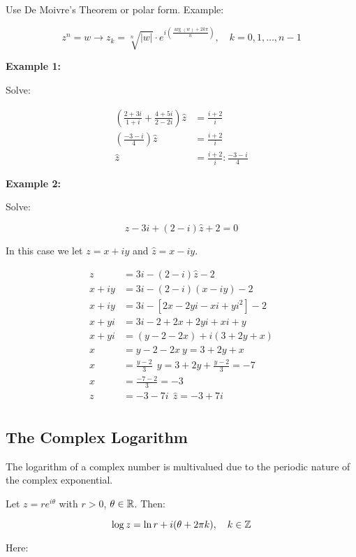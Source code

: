  Use De Moivre’s Theorem or polar form. Example:
	      
\[
	z^n = w \to z_k = \sqrt[n]{|w|} \cdot e^{i\left( \frac{\arg(w) + 2k\pi}{n} \right)}, \quad k = 0, 1, 
	\dots, n-1
\]

\textbf{Example 1:}

Solve:

\begin{align*}
	\left( \frac{2 + 3i}{1 + i} + \frac{4 + 5i}{2 - 2i}\right) \hat{z} &= \frac{i + 2}{i}\\
	\left( \frac{-3 -i}{4} \right) \hat{z} &= \frac{i + 2}{i}\\
	\hat{z} &= \frac{i + 2}{i} : \frac{-3 -i}{4}
\end{align*}

\textbf{Example 2:}

Solve:

\[
	z - 3i + (2 -i)\hat{z} + 2 = 0
\]

In this case we let \( z = x + iy \) and \( \hat{z} = x - iy \).

\begin{align*}
	z &= 3i - (2 - i)\hat{z} - 2\\
	x + iy &= 3i - (2 - i)(x - iy) - 2\\
	x + iy &= 3i - [2x - 2yi -xi +yi^2] - 2\\
	x + yi &= 3i - 2 + 2x + 2yi + xi + y\\
	x + yi &= (y - 2 -2x) + i(3 + 2y + x)\\
	x &= y - 2 -2x\ y = 3 + 2y + x\\
	x &= \frac{y - 2}{3}\ \ y = 3 + 2y + \frac{y-2}{3} = -7\\
	x &= \frac{-7 -2}{3} = -3\\
	z &= -3 -7i\ \ \hat{z} = -3 + 7i\\
\end{align*}

\subsection{The Complex Logarithm}

The logarithm of a complex number is multivalued due to the periodic nature of the complex exponential.

Let \( z = re^{i\theta} \) with \( r > 0 \), \( \theta \in \mathbb{R} \). Then:

\[
	\log z = \ln r + i(\theta + 2\pi k), \quad k \in \mathbb{Z}
\]

Here:

